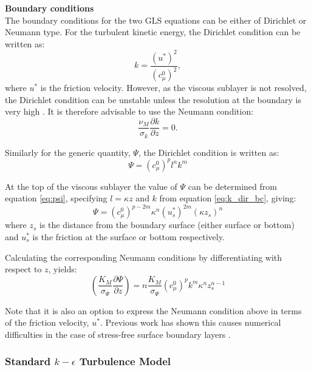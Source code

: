 \par{\textbf{Boundary conditions}\\}
The boundary conditions for the two GLS equations can be either of Dirichlet or Neumann
type. For the turbulent kinetic energy, the Dirichlet condition can be written as:
\begin{equation}
k=\frac{\left(u^*\right)^2}{\left(c_\mu^0\right)^2},
\label{eq:k_dir_bc}
\end{equation}
where $u^*$ is the friction velocity. However, as the viscous sublayer is not
resolved, the Dirichlet condition can be unstable unless the resolution at the
boundary is very high \citep{burchard1999}. It is therefore advisable to use
the Neumann condition:
\begin{equation}
\frac{\nu_M}{\sigma_k}\frac{\partial k}{\partial z} = 0.
\end{equation}

Similarly for the generic quantity, $\Psi$, the Dirichlet condition is written
as:
\begin{equation}
\Psi=\left(c_\mu^0\right)^{p}l^nk^m
\end{equation}

At the top of the viscous sublayer the value of $\Psi$ can be determined from equation \ref{eq:psi}, 
specifying $l=\kappa z$ and $k$ from equation \ref{eq:k_dir_bc}, giving:
\begin{equation}
\Psi=\left(c_\mu^0\right)^{p-2m}\kappa^n\left(u_s^*\right)^{2m}\left(\kappa z_s\right)^n
\end{equation}
where $z_s$ is the distance from the boundary surface (either surface or bottom) and $u_s^*$ is the 
friction at the surface or bottom respectively.

Calculating the corresponding Neumann  conditions by differentiating with respect to $z$, yields:
\begin{equation}
\left(\frac{K_M}{\sigma_{\Psi}}\frac{\partial\Psi}{\partial z}\right) = n\frac{K_M}{\sigma_{\Psi}} \left(c_\mu^0\right)^p k^m \kappa^n z_s^{n-1}
\label{eq:psi-flux-bc}
\end{equation}

Note that it is also an option to express the Neumann condition above in terms
of the friction velocity, $u^*$. Previous work has shown this causes numerical
difficulties in the case of stress-free surface boundary layers \citep{burchard1999}.


\subsubsection{Standard $k-\epsilon$ Turbulence Model}\label{sec:kepsilon}
    

